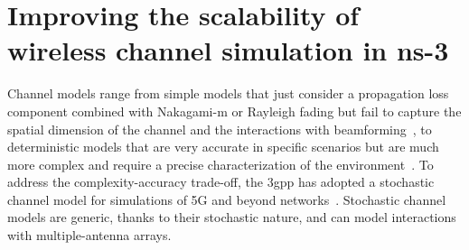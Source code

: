 \section{Improving the scalability of wireless channel simulation in ns-3}
\label{sec:ch-perf-improv}

Channel models range from simple models that just consider a propagation loss component combined with Nakagami-m or Rayleigh fading but fail to capture the spatial dimension of the channel and the interactions with beamforming~\cite{andrews2017modeling}, to deterministic models that are very accurate in specific scenarios but are much more complex and require a precise characterization of the environment~\cite{lecci2020simplified}.
To address the complexity-accuracy trade-off, the \gls{3gpp} has adopted a stochastic channel model for simulations of 5G and beyond networks~\cite{TR38901}. Stochastic channel models are generic, thanks to their stochastic nature, and can model interactions with multiple-antenna arrays.
